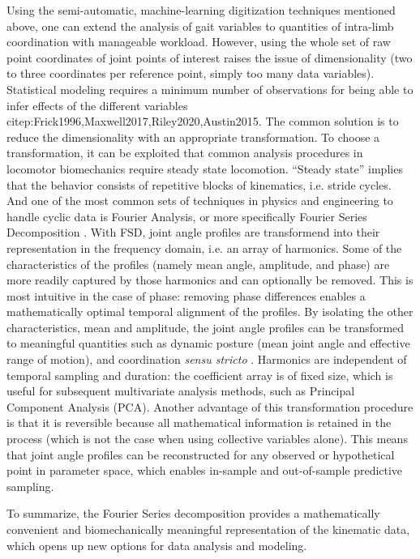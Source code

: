 Using the semi-automatic, machine-learning digitization techniques mentioned above, one can extend the analysis of gait variables to quantities of intra-limb coordination with manageable workload.
However, using the whole set of raw point coordinates of joint points of interest raises the issue of dimensionality (two to three coordinates per reference point, simply too many data variables).
Statistical modeling requires a minimum number of observations for being able to infer effects of the different variables citep:Frick1996,Maxwell2017,Riley2020,Austin2015.
The common solution is to reduce the dimensionality with an appropriate transformation.
To choose a transformation, it can be exploited that common analysis procedures in locomotor biomechanics require steady state locomotion.
``Steady state'' implies that the behavior consists of repetitive blocks of kinematics, i.e. stride cycles.
And one of the most common sets of techniques in physics and engineering to handle cyclic data is Fourier Analysis, or more specifically Fourier Series Decomposition \citep[FSD;][]{Mielke2019,Webb2007,Fourier1822,Bracewell2000,Gray1995,Pike2002}.
With FSD, joint angle profiles are transformend into their representation in the frequency domain, i.e. an array of harmonics.
Some of the characteristics of the profiles (namely mean angle, amplitude, and phase) are more readily captured by those harmonics and can optionally be removed.
This is most intuitive in the case of phase: removing phase differences enables a mathematically optimal temporal alignment of the profiles.
By isolating the other characteristics, mean and amplitude, the joint angle profiles can be transformed to meaningful quantities such as dynamic posture (mean joint angle and effective range of motion), and coordination \emph{sensu stricto} \citep[relative phase/joint timing and residual kinematics, \textit{cf.}][]{Mielke2019}.
Harmonics are independent of temporal sampling and duration: the coefficient array is of fixed size, which is useful for subsequent multivariate analysis methods, such as Principal Component Analysis (PCA).
Another advantage of this transformation procedure is that it is reversible because all mathematical information is retained in the process (which is not the case when using collective variables alone).
This means that joint angle profiles can be reconstructed for any observed or hypothetical point in parameter space, which enables in-sample and out-of-sample predictive sampling.

To summarize, the Fourier Series decomposition provides a mathematically convenient and biomechanically meaningful representation of the kinematic data, which opens up new options for data analysis and modeling.


